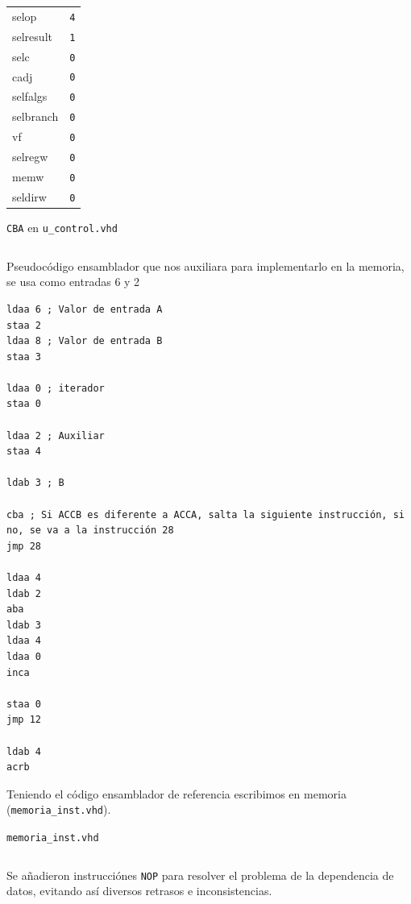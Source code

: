\documentclass{IEEEtran}
\newenvironment{code}{\captionsetup{type=listing}}{}
\begin{document}
\begin{itemize}
\begin{table}[htbp]
\begin{tabular}{ll}
selop & \texttt{4}\\
selresult & \texttt{1}\\
selc & \texttt{0}\\
cadj & \texttt{0}\\
selfalgs & \texttt{0}\\
selbranch & \texttt{0}\\
vf & \texttt{0}\\
selregw & \texttt{0}\\
memw & \texttt{0}\\
seldirw & \texttt{0}\\
\hline
\end{tabular}
\end{table}
\begin{code}
\caption{\texttt{CBA} en \texttt{u\_control.vhd}}
\inputminted[firstline=253, lastline=271]{vhdl}{../Risc/u_control.vhd}
\end{code}
\end{itemize}

\begin{code}
\caption{Pseudocódigo ensamblador que nos auxiliara para implementarlo en la memoria, se usa como entradas 6 y 2}
\begin{verbatim}
ldaa 6 ; Valor de entrada A
staa 2
ldaa 8 ; Valor de entrada B
staa 3

ldaa 0 ; iterador
staa 0

ldaa 2 ; Auxiliar
staa 4

ldab 3 ; B

cba ; Si ACCB es diferente a ACCA, salta la siguiente instrucción, si no, se va a la instrucción 28
jmp 28

ldaa 4
ldab 2
aba
ldab 3
ldaa 4
ldaa 0
inca

staa 0
jmp 12

ldab 4
acrb
\end{verbatim}
\end{code}

Teniendo el código ensamblador de referencia escribimos en memoria (\texttt{memoria\_inst.vhd}).
\begin{code}
\caption{\texttt{memoria\_inst.vhd}}
\inputminted{vhdl}{../Risc/memoria_inst.vhd}
\end{code}

Se añadieron instrucciónes \texttt{NOP} para resolver el problema de la dependencia de datos, evitando así diversos retrasos e inconsistencias.
\end{document}

